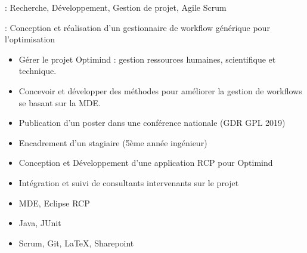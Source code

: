 

 : Recherche, Développement, Gestion de projet, Agile Scrum 

 : Conception et réalisation d'un gestionnaire de workflow générique pour l'optimisation

\bigskip


\begin{itemize}
\item Gérer le projet Optimind : gestion ressources humaines, scientifique et technique.
\item Concevoir et développer des méthodes pour améliorer la gestion de workflows se basant sur la MDE.
\end{itemize} 


\begin{itemize}
\item Publication d'un poster dans une conférence nationale (GDR GPL 2019)
\item Encadrement d'un stagiaire (5ème année ingénieur)
\item Conception et Développement d'une application RCP pour Optimind
\item Intégration et suivi de consultants intervenants sur le projet
\end{itemize} 


\begin{itemize}
\item MDE, Eclipse RCP
\item Java, JUnit
\item Scrum, Git, LaTeX, Sharepoint
\end{itemize}